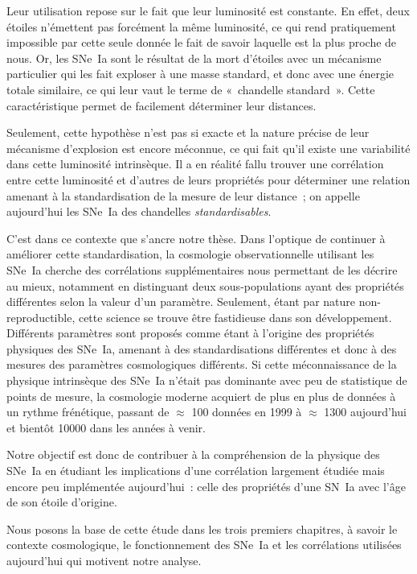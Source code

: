 \documentclass[../main/main.tex]{subfiles}
\begin{document}
Leur utilisation repose sur le fait que leur luminosité est constante. En effet,
deux étoiles n'émettent pas forcément la même luminosité, ce qui rend
pratiquement impossible par cette seule donnée le fait de savoir laquelle est la
plus proche de nous. Or, les SNe~Ia sont le résultat de la mort d'étoiles
avec un mécanisme particulier qui les fait exploser à une masse standard, et
donc avec une énergie totale similaire, ce qui leur vaut le terme de «~chandelle
standard~». Cette caractéristique permet de facilement déterminer leur
distances.

Seulement, cette hypothèse n'est pas si exacte et la nature précise de leur
mécanisme d'explosion est encore méconnue, ce qui fait qu'il existe une
variabilité dans cette luminosité intrinsèque. Il a en réalité fallu trouver une
corrélation entre cette luminosité et d'autres de leurs propriétés pour
déterminer une relation amenant à la standardisation de la mesure de leur
distance~; on appelle aujourd'hui les SNe~Ia des chandelles
\textit{standardisables}.

C'est dans ce contexte que s'ancre notre thèse. Dans l'optique de continuer à
améliorer cette standardisation, la cosmologie observationnelle utilisant les
SNe~Ia cherche des corrélations supplémentaires nous permettant de les décrire
au mieux, notamment en distinguant deux sous-populations ayant des propriétés
différentes selon la valeur d'un paramètre. Seulement, étant par nature
non-reproductible, cette science se trouve être fastidieuse dans son
développement. Différents paramètres sont proposés comme étant à l'origine des
propriétés physiques des SNe~Ia, amenant à des standardisations différentes et
donc à des mesures des paramètres cosmologiques différents. Si cette
méconnaissance de la physique intrinsèque des SNe~Ia n'était pas dominante avec
peu de statistique de points de mesure, la cosmologie moderne acquiert de plus
en plus de données à un rythme frénétique, passant de $\approx$ 100 données en
1999 à $\approx$ \num{1300} aujourd'hui et bientôt \num{10000} dans les années à
venir.

Notre objectif est donc de contribuer à la compréhension de la physique des
SNe~Ia en étudiant les implications d'une corrélation largement étudiée mais
encore peu implémentée aujourd'hui~: celle des propriétés d'une SN~Ia avec l'âge
de son étoile d'origine.

Nous posons la base de cette étude dans les trois premiers chapitres, à savoir
le contexte cosmologique, le fonctionnement des SNe~Ia et les corrélations
utilisées aujourd'hui qui motivent notre analyse.
\end{document}
